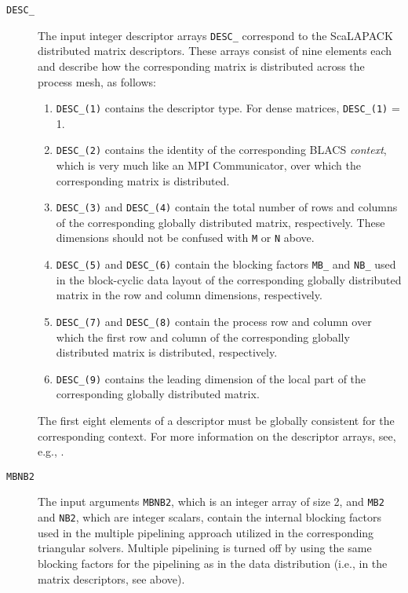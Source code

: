 \documentclass[11pt]{article}
\begin{document}
\begin{description}
\item[\texttt{DESC\_}] The input integer descriptor arrays
\texttt{DESC\_} correspond to the ScaLAPACK distributed matrix
descriptors. These arrays consist of nine elements each and
describe how the corresponding matrix is distributed across the
process mesh, as follows:
\begin{enumerate}
\item \texttt{DESC\_(1)} contains the descriptor type. For dense
matrices, \texttt{DESC\_(1)} = 1. \item \texttt{DESC\_(2)}
contains the identity of the corresponding BLACS {\em context},
which is very much like an MPI Communicator, over which the
corresponding matrix is distributed. \item \texttt{DESC\_(3)} and
\texttt{DESC\_(4)} contain the total number of rows and columns of
the corresponding globally distributed matrix, respectively. These
dimensions should not be confused with \texttt{M} or \texttt{N}
above.
\item \texttt{DESC\_(5)} and \texttt{DESC\_(6)} contain the
blocking factors \texttt{MB\_} and \texttt{NB\_} used in the
block-cyclic data layout of the corresponding globally distributed
matrix in the row and column dimensions, respectively. \item
\texttt{DESC\_(7)} and \texttt{DESC\_(8)} contain the process row
and column over which the first row and column of the
corresponding globally distributed matrix is distributed,
respectively. \item \texttt{DESC\_(9)} contains the leading
dimension of the local part of the corresponding globally
distributed matrix.
\end{enumerate}
The first eight elements of a descriptor must be globally
consistent for the corresponding context. For more information on
the descriptor arrays, see, e.g., \cite{blackfordetal97}.

\item[\texttt{MBNB2}] The input arguments \texttt{MBNB2}, which is
an integer array of size 2, and \texttt{MB2} and \texttt{NB2},
which are integer scalars, contain the internal blocking factors
used in the multiple pipelining approach
\cite{granatkagstrom09a,granatkagstrom09b} utilized in the
corresponding triangular solvers. Multiple pipelining is turned
off by using the same blocking factors for the pipelining as in
the data distribution (i.e., in the matrix descriptors, see
above).
\end{description}
\end{document}
